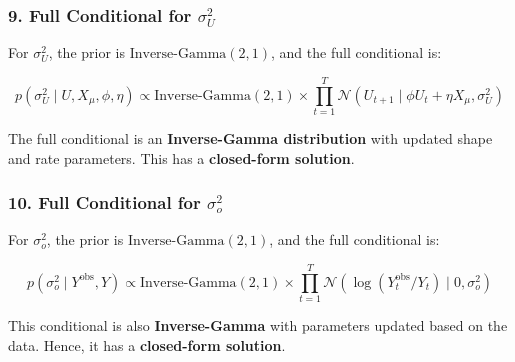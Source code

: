 \documentclass[
  letterpaper,
  DIV=11,
  numbers=noendperiod]{scrartcl}
\begin{document}
\subsubsection{\texorpdfstring{9. Full Conditional for
\(\sigma_U^2\)}{9. Full Conditional for \textbackslash sigma\_U\^{}2}}\label{full-conditional-for-sigma_u2}

For \(\sigma_U^2\), the prior is \(\text{Inverse-Gamma}(2, 1)\), and the
full conditional is:

\begin{equation}
p(\sigma_U^2 \mid U, X_{\mu}, \phi, \eta) \propto \text{Inverse-Gamma}(2, 1) \times \prod_{t=1}^{T} \mathcal{N}(U_{t+1} \mid \phi U_t + \eta X_{\mu}, \sigma_U^2)
\end{equation}

The full conditional is an \textbf{Inverse-Gamma distribution} with
updated shape and rate parameters. This has a \textbf{closed-form
solution}.

\subsubsection{\texorpdfstring{10. Full Conditional for
\(\sigma_o^2\)}{10. Full Conditional for \textbackslash sigma\_o\^{}2}}\label{full-conditional-for-sigma_o2}

For \(\sigma_o^2\), the prior is \(\text{Inverse-Gamma}(2, 1)\), and the
full conditional is:

\begin{equation}
p(\sigma_o^2 \mid Y^{\text{obs}}, Y) \propto \text{Inverse-Gamma}(2, 1) \times \prod_{t=1}^{T} \mathcal{N}(\log(Y_t^{\text{obs}} / Y_t) \mid 0, \sigma_o^2)
\end{equation}

This conditional is also \textbf{Inverse-Gamma} with parameters updated
based on the data. Hence, it has a \textbf{closed-form solution}.
\end{document}
